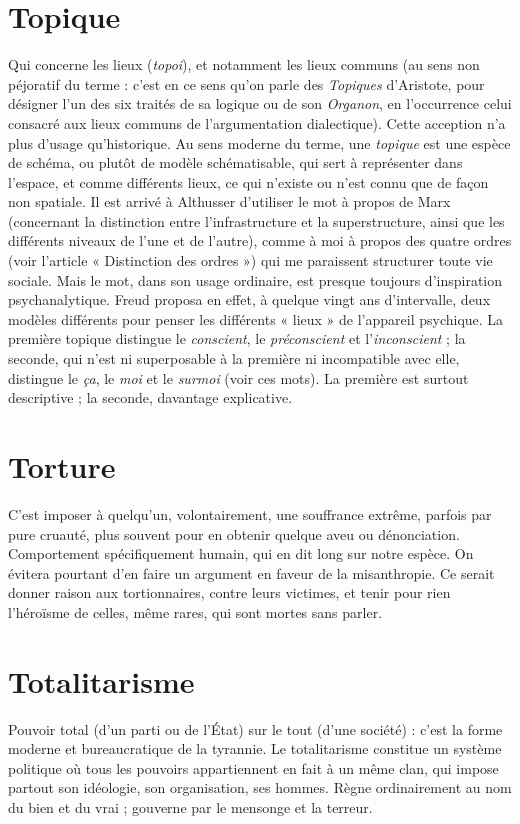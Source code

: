 \section{Topique}
Qui concerne les lieux ({\it topoi}), et notamment les lieux communs
(au sens non péjoratif du terme : c’est en ce sens qu’on parle des
{\it Topiques} d’Aristote, pour désigner l’un des six traités de sa logique ou de son
{\it Organon}, en l'occurrence celui consacré aux lieux communs de l’argumentation
dialectique). Cette acception n’a plus d’usage qu’historique. Au sens moderne
du terme, une {\it topique} est une espèce de schéma, ou plutôt de modèle schématisable,
qui sert à représenter dans l’espace, et comme différents lieux, ce qui
n'existe ou n’est connu que de façon non spatiale. Il est arrivé à Althusser d’utiliser
le mot à propos de Marx (concernant la distinction entre l’infrastructure
et la superstructure, ainsi que les différents niveaux de l’une et de l’autre),
comme à moi à propos des quatre ordres (voir l’article « Distinction des
ordres ») qui me paraissent structurer toute vie sociale. Mais le mot, dans son
usage ordinaire, est presque toujours d'inspiration psychanalytique. Freud proposa
en effet, à quelque vingt ans d’intervalle, deux modèles différents pour
penser les différents « lieux » de l'appareil psychique. La première topique distingue
le {\it conscient}, le {\it préconscient} et l'{\it inconscient} ; la seconde, qui n’est ni superposable
à la première ni incompatible avec elle, distingue le {\it ça}, le {\it moi} et le
{\it surmoi} (voir ces mots). La première est surtout descriptive ; la seconde, davantage
explicative.

\section{Torture}
C'est imposer à quelqu'un, volontairement, une souffrance
extrême, parfois par pure cruauté, plus souvent pour en obtenir
quelque aveu ou dénonciation. Comportement spécifiquement humain, qui en
dit long sur notre espèce. On évitera pourtant d’en faire un argument en faveur
de la misanthropie. Ce serait donner raison aux tortionnaires, contre leurs victimes,
et tenir pour rien l’héroïsme de celles, même rares, qui sont mortes sans
parler.

\section{Totalitarisme}
Pouvoir total (d’un parti ou de l’État) sur le tout (d’une
société) : c’est la forme moderne et bureaucratique de la
tyrannie. Le totalitarisme constitue un système politique où tous les pouvoirs
appartiennent en fait à un même clan, qui impose partout son idéologie, son
organisation, ses hommes. Règne ordinairement au nom du bien et du vrai ;
gouverne par le mensonge et la terreur.


